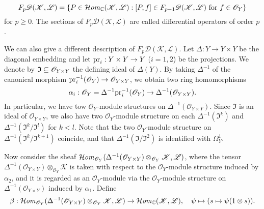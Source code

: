\[F_p\mathscr{D}(\mathscr{K},\mathscr{L})=\{P\in\operatorname{\mathcal{H}\hspace*{-0.4pt}\textit{om}\hspace{0.5pt}}_{\mathbb{C}}(\mathscr{K},\mathscr{L}):\text{$[P,f]\in F_{p-1}\mathscr{D}(\mathscr{K},\mathscr{L})$ for $f\in\mathscr{O}_Y$}\}\]
for $p\geq 0$. The sections of $F_p\mathscr{D}(\mathscr{K},\mathscr{L})$ are called differential operators of order $p$.\par
We can also give a different description of $F_p\mathscr{D}(\mathscr{K},\mathscr{L})$. Let $\Delta:Y\to Y\times Y$ be the diagonal embedding and let $\mathrm{pr}_i:Y\times Y\to Y$ ($i=1,2$) be the projections. We denote by $\mathfrak{I}\subseteq\mathscr{O}_{Y\times Y}$ the defining ideal of $\Delta(Y)$. By taking $\Delta^{-1}$ of the canonical morphism $\mathrm{pr}_i^{-1}(\mathscr{O}_Y)\to\mathscr{O}_{Y\times Y}$, we obtain two ring homomorphisms
\[\alpha_i:\mathscr{O}_Y=\Delta^{-1}\mathrm{pr}_i^{-1}(\mathscr{O}_Y)\to\Delta^{-1}(\mathscr{O}_{Y\times Y}).\]
In particular, we have tow $\mathscr{O}_Y$-module structures on $\Delta^{-1}(\mathscr{O}_{Y\times Y})$. Since $\mathfrak{I}$ is an ideal of $\mathscr{O}_{Y\times Y}$, we also have two $\mathscr{O}_Y$-module structure on each $\Delta^{-1}(\mathfrak{I}^k)$ and $\Delta^{-1}(\mathfrak{I}^k/\mathfrak{I}^{l})$ for $k<l$. Note that the two $\mathscr{O}_Y$-module structure on $\Delta^{-1}(\mathfrak{I}^k/\mathfrak{I}^{k+1})$ coincide, and that $\Delta^{-1}(\mathfrak{I}/\mathfrak{I}^2)$ is identified with $\Omega_Y^1$.\par 
Now consider the sheaf $\operatorname{\mathcal{H}\hspace*{-0.4pt}\textit{om}\hspace{0.5pt}}_{\mathscr{O}_Y}(\Delta^{-1}(\mathscr{O}_{Y\times Y})\otimes_{\mathscr{O}_Y}\mathscr{K},\mathscr{L})$, where the tensor $\Delta^{-1}(\mathscr{O}_{Y\times Y})\otimes_{\mathscr{O}_Y}\mathscr{K}$ is taken with respect to the $\mathscr{O}_Y$-module structure induced by $\alpha_2$, and it is regarded as an $\mathscr{O}_Y$-module via the $\mathscr{O}_Y$-module structure on $\Delta^{-1}(\mathscr{O}_{Y\times Y})$ induced by $\alpha_1$. Define
\[\beta:\operatorname{\mathcal{H}\hspace*{-0.4pt}\textit{om}\hspace{0.5pt}}_{\mathscr{O}_Y}(\Delta^{-1}(\mathscr{O}_{Y\times Y})\otimes_{\mathscr{O}_Y}\mathscr{K},\mathscr{L})\to\operatorname{\mathcal{H}\hspace*{-0.4pt}\textit{om}\hspace{0.5pt}}_{\mathbb{C}}(\mathscr{K},\mathscr{L}),\quad \psi\mapsto (s\mapsto\psi(1\otimes s)).\]

